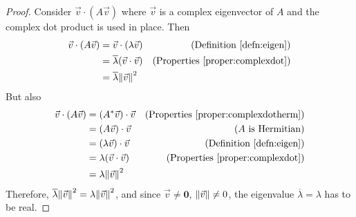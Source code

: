 \begin{proof}
Consider $\vec{v} \cdot (A\vec{v})$ where $\vec{v}$ is a complex eigenvector of $A$ and the complex dot product is used in place. Then
\begin{align*}
\vec{v} \cdot (A\vec{v}) &= \vec{v} \cdot (\lambda \vec{v}) & \text{(Definition \ref{defn:eigen})} \\
&= \overline{\lambda} (\vec{v} \cdot \vec{v}) & \text{(Properties \ref{proper:complexdot})} \\
&= \overline{\lambda} \norm{\vec{v}}^2
\end{align*}
But also
\begin{align*}
\vec{v} \cdot (A\vec{v}) &= (A^*\vec{v}) \cdot \vec{v} & \text{(Properties \ref{proper:complexdotherm})} \\
&= (A\vec{v}) \cdot \vec{v} & \text{($A$ is Hermitian)} \\
&= (\lambda\vec{v}) \cdot \vec{v} & \text{(Definition \ref{defn:eigen})} \\
&= \lambda (\vec{v} \cdot \vec{v}) & \text{(Properties \ref{proper:complexdot})} \\
&= \lambda \norm{\vec{v}}^2
\end{align*}
Therefore, $\overline{\lambda}\norm{\vec{v}}^2 = \lambda \norm{\vec{v}}^2$, and since $\vec{v} \neq \textbf{0}$, $\norm{\vec{v}} \neq 0$, the eigenvalue $\overline{\lambda} = \lambda$ has to be real.
\end{proof}

